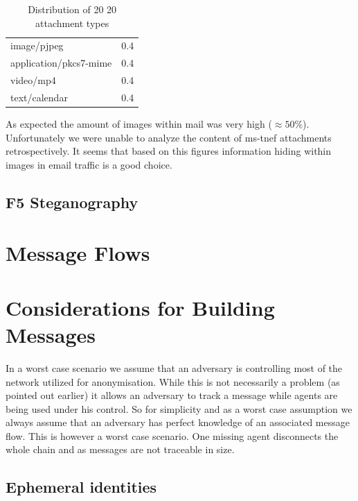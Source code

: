 \begin{table}[H]
\begin{tabular}{l|r}
	image/pjpeg                                                                 &	0.4\\
	application/pkcs7-mime                                                      &	0.4\\
	video/mp4                                                                   &	0.4\\
	text/calendar                                                               &	0.4\\\hline
\end{tabular}
	\caption{Distribution of 20 20 attachment types}
\label{tab:emailAttachments}
\end{table}

As expected the amount of images within mail was very high ($\approx 50\%$). Unfortunately we were unable to analyze the content of ms-tnef attachments retrospectively. It seems that based on this figures information hiding within images in email traffic is a good choice.

\subsection{F5 Steganography}


\section{Message Flows}


\section{Considerations for Building Messages}
In a worst case scenario we assume that an adversary is controlling most of the network utilized for anonymisation. While this is not necessarily a problem (as pointed out earlier) it allows an adversary to track a message while agents are being used under his control. So for simplicity and as a worst case assumption we always assume that an adversary has perfect knowledge of an associated message flow. This is however a worst case scenario. One missing agent disconnects the whole chain and as messages are not traceable in size.


\subsection{Ephemeral identities}

